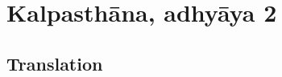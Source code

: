 \newcommand{\plant}[4]{#1 (\emph{#2})\footnote{#3; see #4}}
\let\chemical = \plant
\newcommand{\skt}[2]{#1 (\emph{#2})}
\newcommand{\sskt}[2]{\empty}
%
\newcommand{\diff}[1]{\textcolor{red}{#1}}

\section{Kalpasthāna, adhyāya 2}


\subsection{Translation}

